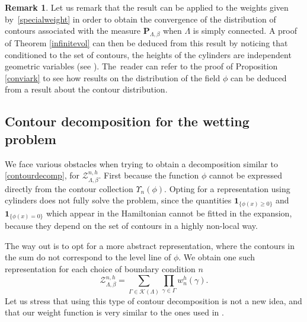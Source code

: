 \documentclass[10pt]{amsart}
\let\mathcal\mathscr
\numberwithin{equation}{section}
\theoremstyle{plain}
\theoremstyle{definition}
\newtheorem{rem}[theorem]{Remark}
\newcommand{\ind}{\mathbf{1}}
\newcommand{\cZ}{{\ensuremath{\mathcal Z}} }
\newcommand{\cK}{{\ensuremath{\mathcal K}} }
\newcommand{\bP}{{\ensuremath{\mathbf P}} }
\newcommand{\gb}{\beta}
\newcommand{\gG}{\Gamma}
\newcommand{\gL}{\Lambda}
\begin{document}
\begin{rem}
Let us remark that the result can be applied to the weights given by~\eqref{specialweight} in order to obtain the convergence of the distribution
of contours associated with the measure $\bP_{\gL,\gb}$ when $\gL$ is simply connected.
A proof of Theorem \ref{infinitevol} can then be deduced from this result by noticing that conditioned to the set of contours, the heights of the cylinders are
independent geometric variables (see \eg \cite[Lem.\,4.3]{cf:part1}). The~reader can refer to the proof of Proposition \ref{conviark} to see
how results on the distribution of the field $\phi$ can be deduced from a result about the contour distribution.
\end{rem}

\subsection{Contour decomposition for the wetting problem} \label{contsec}

We face various obstacles when trying to obtain a decomposition similar to \eqref{contourdecomp}, for $\cZ^{n,h}_{\gL,\gb}$.
First because the function $\phi$ cannot be expressed directly from the contour collection $\Upsilon_n(\phi)$.
Opting for a representation using cylinders does not fully solve the problem,
since the quantities $\ind_{\{\phi(x)\ge 0\}}$ and $\ind_{\{ \phi(x)=0\}}$ which appear in the Hamiltonian cannot be fitted in the expansion,
because they depend on the set of contours in a highly non-local way.

The way out is to opt for a more abstract representation, where the contours in the sum do not correspond to the level line of $\phi$.
We obtain one such representation for each choice of boundary condition $n$
\begin{equation}\label{reprezent}
\cZ^{n,h}_{\gL,\gb}= \sum_{\gG\in \cK(\gL)} \prod_{\gamma\in \gG} w^h_n(\gamma).
\end{equation}
Let us stress that using this type of contour decomposition is not a new idea, and that our
weight function is very similar to the ones used \eg in \cite{cf:ADM, cf:CM}.
\end{document}

